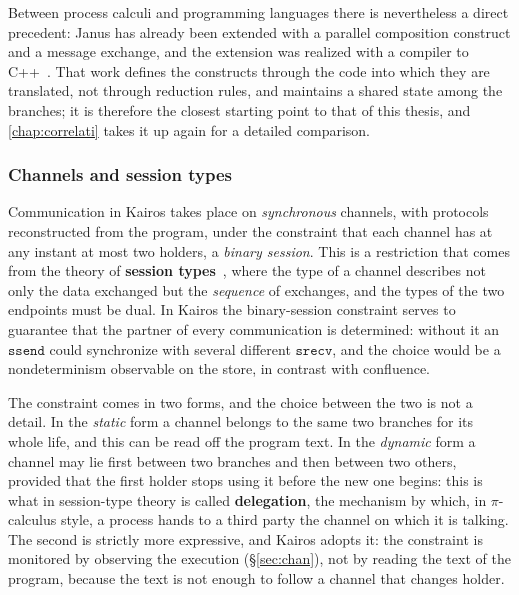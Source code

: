 Between process calculi and programming languages there is nevertheless a direct
precedent: Janus has already been extended with a parallel composition construct
and a message exchange, and the extension was realized with a
compiler to C++~\cite{Sammarchi2019}. That work defines the constructs
through the code into which they are translated, not through reduction
rules, and maintains a shared state among the branches; it is therefore the closest
starting point to that of this thesis, and \cref{chap:correlati} takes it
up again for a detailed comparison.

\subsubsection{Channels and session types}

Communication in Kairos takes place on \emph{synchronous} channels, with protocols
reconstructed from the program,
under the constraint that each channel has at any instant at most two holders, a
\emph{binary session}. This is a restriction that comes from the theory of
\textbf{session types}~\cite{HondaVasconcelosKubo1998,%
HondaYoshidaCarbone2008}, where the type of a channel describes not only the data
exchanged but the \emph{sequence} of exchanges, and the types of the two endpoints must
be dual. In Kairos the binary-session constraint serves to guarantee that the
partner of every communication is determined: without
it an $\mathtt{ssend}$ could synchronize with several different $\mathtt{srecv}$,
and the choice would be a nondeterminism observable on the store, in
contrast with confluence.

The constraint comes in two forms, and the choice between the two is not a detail. In the
\emph{static} form a channel belongs to the same two branches for its whole life,
and this can be read off the program text. In the \emph{dynamic} form a channel
may lie first between two branches and then between two others, provided that the first holder
stops using it before the new one begins: this is what in session-type
theory is called \textbf{delegation}, the mechanism by which, in
$\pi$-calculus style, a process hands to a third party the channel on which it is talking. The
second is strictly more expressive, and Kairos adopts it: the constraint is
monitored by observing the execution (\S\ref{sec:chan}), not by reading the text of the
program, because the text is not enough to follow a channel that changes holder.

